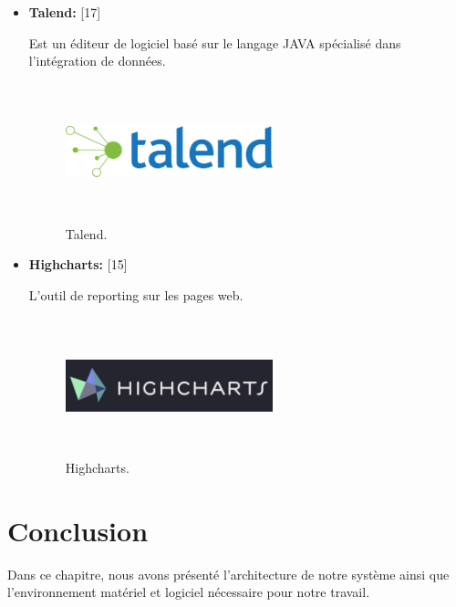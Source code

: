 \begin{itemize}
\item {  \textbf{ Talend:} } [17]


 Est un éditeur de logiciel basé sur le langage JAVA spécialisé dans l'intégration de données.


\begin{figure}[H]
\center
\includegraphics[width=6cm,height=4cm]{./figures/teklogos/talend.png}
\caption{Talend.}
\end{figure}


\item {  \textbf{ Highcharts:} } [15]


L'outil de \guillemotleft{} reporting \guillemotright{} sur les pages web.


\begin{figure}[H]
\center
\includegraphics[width=6cm,height=4cm]{./figures/teklogos/highcharts.png}
\caption{Highcharts.}
\end{figure}


\end{itemize}


\section{Conclusion}

Dans ce chapitre, nous avons présenté l’architecture de notre système ainsi que
l’environnement matériel et logiciel nécessaire pour notre travail.


















